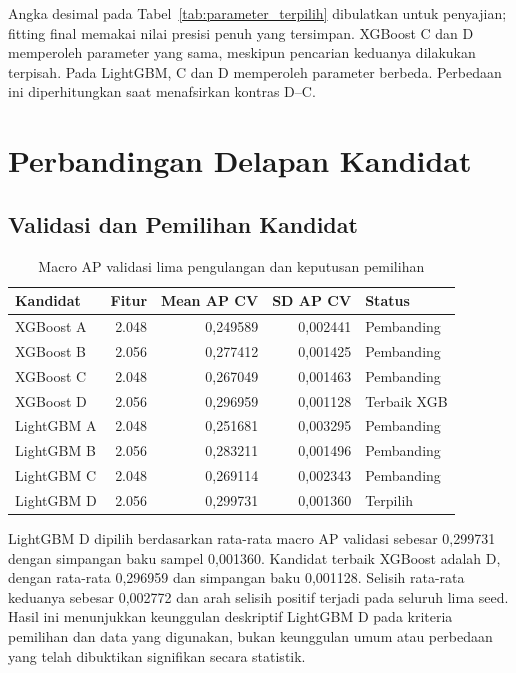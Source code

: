 Angka desimal pada Tabel~\ref{tab:parameter_terpilih} dibulatkan untuk penyajian; fitting final memakai nilai presisi penuh yang tersimpan. XGBoost C dan D memperoleh parameter yang sama, meskipun pencarian keduanya dilakukan terpisah. Pada LightGBM, C dan D memperoleh parameter berbeda. Perbedaan ini diperhitungkan saat menafsirkan kontras D--C.

\section{Perbandingan Delapan Kandidat}
\subsection{Validasi dan Pemilihan Kandidat}
\begin{table}[htbp]
\centering
\caption{Macro AP validasi lima pengulangan dan keputusan pemilihan}
\label{tab:validasi_kandidat}
\small
\setlength{\tabcolsep}{4pt}
\begin{tabular}{lrrrl}
\toprule
Kandidat & Fitur & Mean AP CV & SD AP CV & Status \\
\midrule
XGBoost A & 2.048 & 0,249589 & 0,002441 & Pembanding \\
XGBoost B & 2.056 & 0,277412 & 0,001425 & Pembanding \\
XGBoost C & 2.048 & 0,267049 & 0,001463 & Pembanding \\
XGBoost D & 2.056 & 0,296959 & 0,001128 & Terbaik XGB \\
LightGBM A & 2.048 & 0,251681 & 0,003295 & Pembanding \\
LightGBM B & 2.056 & 0,283211 & 0,001496 & Pembanding \\
LightGBM C & 2.048 & 0,269114 & 0,002343 & Pembanding \\
LightGBM D & 2.056 & 0,299731 & 0,001360 & Terpilih \\
\bottomrule
\end{tabular}
\end{table}

LightGBM D dipilih berdasarkan rata-rata macro AP validasi sebesar 0,299731 dengan simpangan baku sampel 0,001360. Kandidat terbaik XGBoost adalah D, dengan rata-rata 0,296959 dan simpangan baku 0,001128. Selisih rata-rata keduanya sebesar 0,002772 dan arah selisih positif terjadi pada seluruh lima seed. Hasil ini menunjukkan keunggulan deskriptif LightGBM D pada kriteria pemilihan dan data yang digunakan, bukan keunggulan umum atau perbedaan yang telah dibuktikan signifikan secara statistik.

